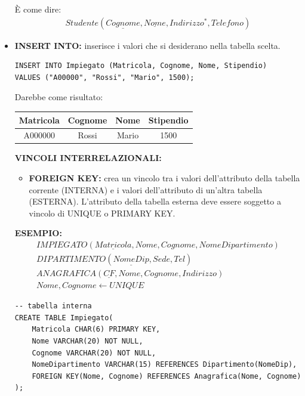 \documentclass{article}
\begin{document}
\begin{itemize}
È come dire:
\begin{align*}
     Studente(\underline{Cognome},\underline{Nome}, Indirizzo^*,Telefono)
\end{align*}

\item \textbf{INSERT INTO:} inserisce i valori che si desiderano nella tabella scelta.

\begin{lstlisting}[style=sqlstyle]
INSERT INTO Impiegato (Matricola, Cognome, Nome, Stipendio) 
VALUES ("A00000", "Rossi", "Mario", 1500);
\end{lstlisting}
\newpage
Darebbe come risultato:
\begin{table}[h!]
	\centering
	\begin{tabular}{|c|c|c|c|}
		\hline
		\textbf{Matricola} & \textbf{Cognome} & \textbf{Nome} & \textbf{Stipendio} \\
		\hline
		A000000 & Rossi & Mario & 1500 \\
		\hline
	\end{tabular}
\end{table}

\textbf{VINCOLI INTERRELAZIONALI:}
\begin{itemize}
    \item \textbf{FOREIGN KEY:} crea un vincolo tra i valori dell'attributo della tabella corrente (INTERNA) 
    e i valori dell'attributo di un'altra tabella (ESTERNA). 
    L'attributo della tabella esterna deve essere soggetto a vincolo di UNIQUE o PRIMARY KEY.
\end{itemize}



\textbf{ESEMPIO:}
\begin{align*}
    IMPIEGATO(\underline{Matricola}, Nome, Cognome, NomeDipartimento)\\
    DIPARTIMENTO(\underline{NomeDip}, Sede, Tel)\\
    ANAGRAFICA(\underline{CF}, Nome, Cognome, Indirizzo)
    \\ Nome, Cognome \leftarrow UNIQUE
\end{align*}

\begin{lstlisting}[style=sqlstyle]
-- tabella interna
CREATE TABLE Impiegato(
    Matricola CHAR(6) PRIMARY KEY,
    Nome VARCHAR(20) NOT NULL,
    Cognome VARCHAR(20) NOT NULL,
    NomeDipartimento VARCHAR(15) REFERENCES Dipartimento(NomeDip),
    FOREIGN KEY(Nome, Cognome) REFERENCES Anagrafica(Nome, Cognome)
);


\end{lstlisting}
\end{itemize}
\end{document}
